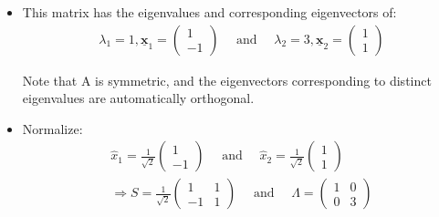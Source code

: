 \documentclass[10pt,a4paper]{article}
\begin{document}
\begin{itemize}
    \item This matrix has the eigenvalues and corresponding eigenvectors of:
    \begin{align*}
        \lambda_{1}=1, \underline{\mathbf{x}}_{1}=\left(\begin{array}{c}
            1 \\
            -1
            \end{array}\right) \quad \text { and } \quad \lambda_{2}=3, \underline{\mathbf{x}}_{2}=\left(\begin{array}{c}
            1 \\
            1
            \end{array}\right)
    \end{align*}

    Note that A is symmetric, and the eigenvectors corresponding to distinct eigenvalues are
    automatically orthogonal.
    
    \item Normalize:
    \begin{align*}
        \hat{x}_{1}=\frac{1}{\sqrt{2}}\left(\begin{array}{c}
            1 \\
            -1
            \end{array}\right) \quad \text { and } \quad \hat{x}_{2}=\frac{1}{\sqrt{2}}\left(\begin{array}{c}
            1 \\
            1
            \end{array}\right) \\ \Longrightarrow S=\frac{1}{\sqrt{2}}\left(\begin{array}{cc}
            1 & 1 \\
            -1 & 1
            \end{array}\right) \quad \text { and } \quad \Lambda=\left(\begin{array}{cc}
            1 & 0 \\
            0 & 3
            \end{array}\right)
    \end{align*}


\end{itemize}
\end{document}
